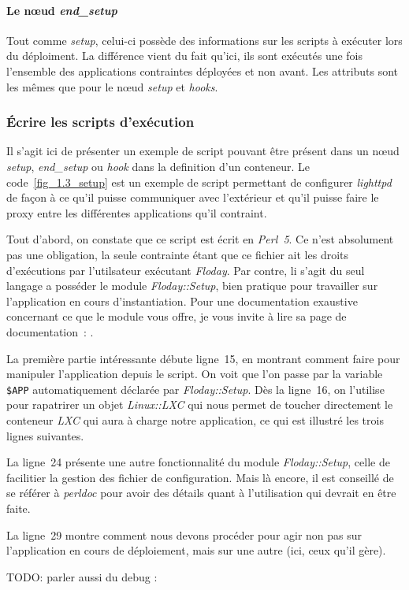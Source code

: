 \paragraph{Le nœud \emph{end\_setup}}
Tout comme \emph{setup}, celui-ci possède des informations sur les scripts à exécuter lors du déploiment.
La différence vient du fait qu'ici, ils sont exécutés une fois l'ensemble des applications contraintes déployées et non avant.
Les attributs sont les mêmes que pour le nœud \emph{setup} et \emph{hooks}.

\subsubsection{Écrire les scripts d'exécution}
Il s'agit ici de présenter un exemple de script pouvant être présent dans un nœud \emph{setup}, \emph{end\_setup} ou \emph{hook} dans la \gls{definition} d'un \gls{conteneur}.
Le code~\ref{fig_1.3_setup} est un exemple de script permettant de configurer \emph{lighttpd} de façon à ce qu'il puisse communiquer avec l'extérieur et qu'il puisse faire le proxy entre les différentes applications qu'il \gls{contraint}.



Tout d'abord, on constate que ce script est écrit en \emph{Perl~5}.
Ce n'est absolument pas une obligation, la seule contrainte étant que ce fichier ait les droits d'exécutions par l'utilsateur exécutant \emph{Floday}.
Par contre, li s'agit du seul langage a posséder le module \emph{Floday::Setup}, bien pratique pour travailler sur l'\gls{application} en cours d'instantiation.
Pour une documentation exaustive concernant ce que le module vous offre, je vous invite à lire sa page de documentation~:
.

La première partie intéressante débute ligne~15, en montrant comment faire pour manipuler l'application depuis le script.
On voit que l'on passe par la variable {\tt\$APP} automatiquement déclarée par \emph{Floday::Setup}.
Dès la ligne~16, on l'utilise pour rapatrirer un objet \emph{Linux::LXC} qui nous permet de toucher directement le conteneur \emph{LXC} qui aura à charge notre application, ce qui est illustré les trois lignes suivantes.

La ligne~24 présente une autre fonctionnalité du module \emph{Floday::Setup}, celle de facilitier la gestion des fichier de configuration.
Mais là encore, il est conseillé de se référer à \emph{perldoc} pour avoir des détails quant à l'utilisation qui devrait en être faite.

La ligne~29 montre comment nous devons procéder pour agir non pas sur l'application en cours de déploiement, mais sur une autre (ici, ceux qu'il gère).

TODO: parler aussi du debug :

